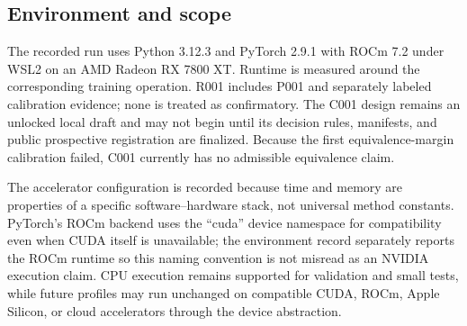 \subsection{Environment and scope}
The recorded run uses Python 3.12.3 and PyTorch 2.9.1 with ROCm 7.2 under WSL2 on an AMD
Radeon RX 7800 XT. Runtime is measured around the corresponding training operation. R001
includes P001 and separately labeled calibration evidence; none is treated as confirmatory.
The C001 design remains an unlocked local draft and may not begin until its decision rules,
manifests, and public prospective registration are finalized. Because the first
equivalence-margin calibration failed, C001 currently has no admissible equivalence claim.

The accelerator configuration is recorded because time and memory are properties of a
specific software--hardware stack, not universal method constants. PyTorch's ROCm backend
uses the “cuda” device namespace for compatibility even when CUDA itself is unavailable;
the environment record separately reports the ROCm runtime so this naming convention is not
misread as an NVIDIA execution claim. CPU execution remains supported for validation and
small tests, while future profiles may run unchanged on compatible CUDA, ROCm, Apple Silicon,
or cloud accelerators through the device abstraction.
